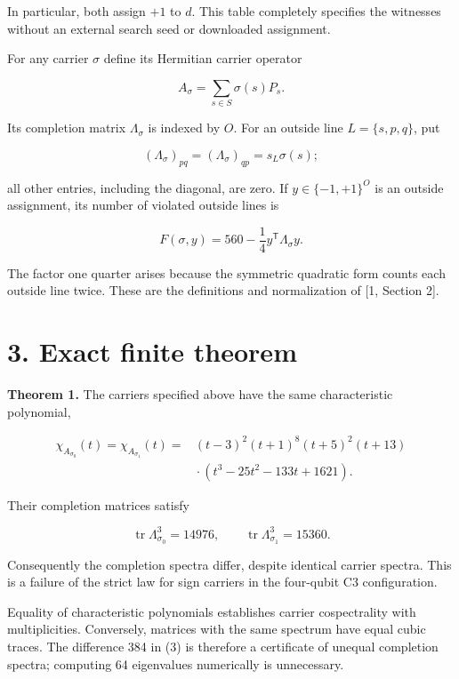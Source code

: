 \documentclass[11pt,letterpaper]{article}
\begin{document}
In particular, both assign \(+1\) to \(d\). This table completely specifies the witnesses without an external search seed or downloaded assignment.

For any carrier \(\sigma\) define its Hermitian carrier operator

\[A_\sigma=\sum_{s\in S}\sigma(s)P_s.\]

Its completion matrix \(\Lambda_\sigma\) is indexed by \(O\). For an outside line \(L=\{s,p,q\}\), put

\[(\Lambda_\sigma)_{pq}=(\Lambda_\sigma)_{qp}
=s_L\sigma(s);\]

all other entries, including the diagonal, are zero. If \(y\in\{-1,+1\}^O\) is an outside assignment, its number of violated outside lines is

\[F(\sigma,y)=560-\frac14y^{\mathsf T}\Lambda_\sigma y.
\tag{1}\]

The factor one quarter arises because the symmetric quadratic form counts each outside line twice. These are the definitions and normalization of {[}1, Section 2{]}.

\section{3. Exact finite theorem}\label{exact-finite-theorem}

\textbf{Theorem 1.} The carriers specified above have the same characteristic polynomial,

\[\begin{aligned}
\chi_{A_{\sigma_0}}(t)=\chi_{A_{\sigma_1}}(t)
={}&(t-3)^2(t+1)^8(t+5)^2(t+13)\\
&{}\cdot(t^3-25t^2-133t+1621).
\end{aligned}
\tag{2}\]

Their completion matrices satisfy

\[\operatorname{tr}\Lambda_{\sigma_0}^3=14976,\qquad
\operatorname{tr}\Lambda_{\sigma_1}^3=15360.
\tag{3}\]

Consequently the completion spectra differ, despite identical carrier spectra. This is a failure of the strict law for sign carriers in the four-qubit C3 configuration.

Equality of characteristic polynomials establishes carrier cospectrality with multiplicities. Conversely, matrices with the same spectrum have equal cubic traces. The difference 384 in (3) is therefore a certificate of unequal completion spectra; computing 64 eigenvalues numerically is unnecessary.
\end{document}
